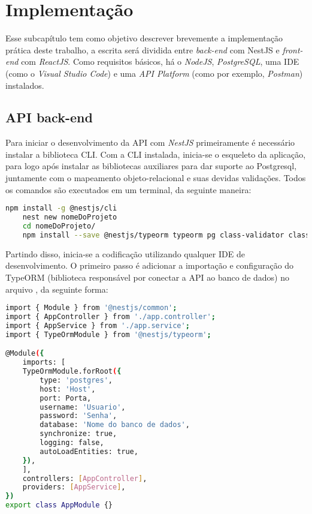 \section{Implementação}
\label{sec:implementacao}

Esse subcapítulo tem como objetivo descrever brevemente a implementação prática deste trabalho, a escrita será dividida entre \textit{back-end} com NestJS e \textit{front-end} com \textit{ReactJS}. Como requisitos básicos, há o \textit{NodeJS}, \textit{PostgreSQL}, uma IDE (como o \textit{Visual Studio Code}) e uma \textit{API Platform} (como por exemplo, \textit{Postman}) instalados. 

\subsection{API back-end}
\label{sec:apiBackEnd}
Para iniciar o desenvolvimento da API com \textit{NestJS} primeiramente é necessário instalar a biblioteca CLI. Com a CLI instalada, inicia-se o esqueleto da aplicação, para logo após instalar as bibliotecas auxiliares para dar suporte ao Postgresql, juntamente com o mapeamento objeto-relacional e suas devidas validações. Todos os comandos são executados em um terminal, da seguinte maneira:
\begin{lstlisting}[language=bash]
    npm install -g @nestjs/cli
    nest new nomeDoProjeto
    cd nomeDoProjeto/
    npm install --save @nestjs/typeorm typeorm pg class-validator class-transformer
\end{lstlisting}

Partindo disso, inicia-se a codificação utilizando qualquer IDE de desenvolvimento. O primeiro passo é adicionar a importação e configuração do TypeORM (biblioteca responsável por conectar a API ao banco de dados) no arquivo , da seguinte forma:
\begin{lstlisting}[language=bash]
import { Module } from '@nestjs/common';
import { AppController } from './app.controller';
import { AppService } from './app.service';
import { TypeOrmModule } from '@nestjs/typeorm';

@Module({
    imports: [
    TypeOrmModule.forRoot({
        type: 'postgres',
        host: 'Host',
        port: Porta,
        username: 'Usuario',
        password: 'Senha',
        database: 'Nome do banco de dados',
        synchronize: true,
        logging: false,
        autoLoadEntities: true,
    }),
    ],
    controllers: [AppController],
    providers: [AppService],
})
export class AppModule {}    
\end{lstlisting}

